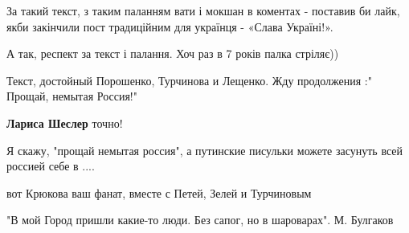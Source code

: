 \begin{itemize}
 
За такий текст, з таким паланням вати і мокшан в коментах - поставив би лайк,
якби закінчили пост традиційним для українця - «Слава Україні!».

А так, респект за текст і палання. Хоч раз в 7 років палка стріляє))

 
Текст, достойный Порошенко, Турчинова и Лещенко. Жду продолжения :" Прощай, немытая Россия!"

\begin{itemize}
 
\textbf{Лариса Шеслер} точно!

 
Я скажу, "прощай немытая россия", а путинские писульки можете засунуть всей россией себе в ....

 
вот Крюкова ваш фанат, вместе с Петей, Зелей и Турчиновым
\end{itemize}

 
"В мой Город пришли какие-то люди. Без сапог, но в шароварах". М. Булгаков


\end{itemize}
